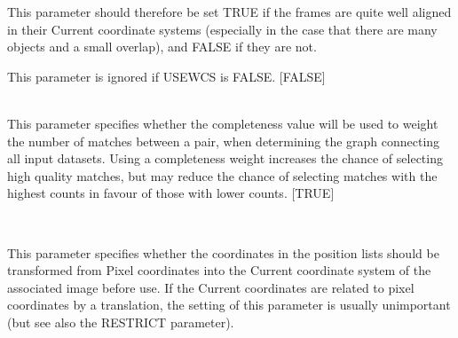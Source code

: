 \documentclass[twoside,11pt]{article}
\renewcommand{\_}{\texttt{\symbol{95}}}
\newcommand{\sstsubsection}[1]{ \item[{#1}] \mbox{} \\}
\newcommand{\sstsubsection}[1]{\item[{#1}]}
\begin{document}
{{{         This parameter should therefore be set TRUE if the frames
         are quite well aligned in their Current coordinate systems
         (especially in the case that there are many objects and a
         small overlap), and FALSE if they are not.

         This parameter is ignored if USEWCS is FALSE.
         [FALSE]
      }
      \sstsubsection{
         USECOMP = LOGICAL (Read)
      } {
         This parameter specifies whether the completeness value will
         be used to weight the number of matches between a pair, when
         determining the graph connecting all input datasets. Using
         a completeness weight increases the chance of selecting high
         quality matches, but may reduce the chance of selecting matches
         with the highest counts in favour of those with lower counts.
         [TRUE]
      }
      \sstsubsection{
         USEWCS = LOGICAL (Read)
      } {
         This parameter specifies whether the coordinates in the
         position lists should be transformed from Pixel coordinates
         into the Current coordinate system of the associated image
         before use.
         If the Current coordinates are related to pixel coordinates
         by a translation, the setting of this parameter is usually
         unimportant (but see also the RESTRICT parameter).

}}}
\end{document}
